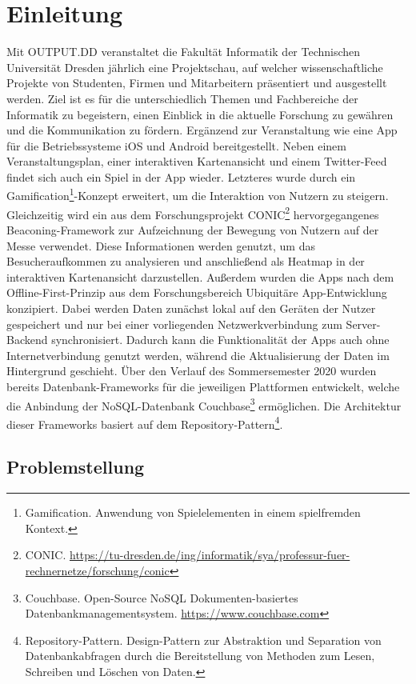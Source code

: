 \chapter{Einleitung}\label{ch:einleitung}

Mit OUTPUT.DD veranstaltet die Fakultät Informatik der Technischen Universität Dresden jährlich eine Projektschau, auf welcher wissenschaftliche Projekte von Studenten, Firmen und Mitarbeitern präsentiert und ausgestellt werden. Ziel ist es für die unterschiedlich Themen und Fachbereiche der Informatik zu begeistern, einen Einblick in die aktuelle Forschung zu gewähren und die Kommunikation zu fördern. Ergänzend zur Veranstaltung wie eine App für die Betriebssysteme iOS und Android bereitgestellt. Neben einem Veranstaltungsplan, einer interaktiven Kartenansicht und einem Twitter-Feed findet sich auch ein Spiel in der App wieder. Letzteres wurde durch ein Gamification\footnote{Gamification. Anwendung von Spielelementen in einem spielfremden Kontext.}-Konzept erweitert, um die Interaktion von Nutzern zu steigern. Gleichzeitig wird ein aus dem Forschungsprojekt CONIC\footnote{CONIC. \url{https://tu-dresden.de/ing/informatik/sya/professur-fuer-rechnernetze/forschung/conic}} hervorgegangenes Beaconing-Framework zur Aufzeichnung der Bewegung von Nutzern auf der Messe verwendet. Diese Informationen werden genutzt, um das Besucheraufkommen zu analysieren und anschließend als Heatmap in der interaktiven Kartenansicht darzustellen. Außerdem wurden die Apps nach dem Offline-First-Prinzip aus dem Forschungsbereich Ubiquitäre App-Entwicklung konzipiert. Dabei werden Daten zunächst lokal auf den Geräten der Nutzer gespeichert und nur bei einer vorliegenden Netzwerkverbindung zum Server-Backend synchronisiert. Dadurch kann die Funktionalität der Apps auch ohne Internetverbindung genutzt werden, während die Aktualisierung der Daten im Hintergrund geschieht. Über den Verlauf des Sommersemester 2020 wurden bereits Datenbank-Frameworks für die jeweiligen Plattformen entwickelt, welche die Anbindung der NoSQL-Datenbank Couchbase\footnote{Couchbase. Open-Source NoSQL Dokumenten-basiertes Datenbankmanagementsystem. \newline \url{https://www.couchbase.com}} ermöglichen. Die Architektur dieser Frameworks basiert auf dem Repository-Pattern\footnote{Repository-Pattern. Design-Pattern zur Abstraktion und Separation von Datenbankabfragen durch die Bereitstellung von Methoden zum Lesen, Schreiben und Löschen von Daten.}.

\section{Problemstellung}\label{se:problem}

